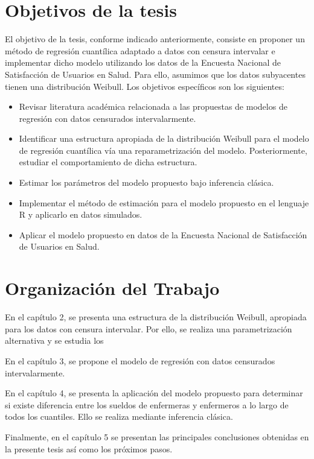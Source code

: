 \documentclass{report}
\begin{document}
\section{Objetivos de la tesis}
El objetivo de la tesis, conforme indicado anteriormente, consiste en proponer un método de regresión cuantílica adaptado a datos con censura intervalar e implementar dicho modelo utilizando los datos de la Encuesta Nacional de Satisfacción de Usuarios en Salud. Para ello, asumimos que los datos subyacentes tienen una distribución Weibull. Los objetivos específicos son los siguientes:

\begin{itemize}
	\item Revisar literatura académica relacionada a las propuestas de modelos de regresión con datos censurados intervalarmente.
	\item Identificar una estructura apropiada de la distribución Weibull para el modelo de regresión cuantílica vía una reparametrización del modelo. Posteriormente, estudiar el comportamiento de dicha estructura.
	\item Estimar los parámetros del modelo propuesto bajo inferencia clásica.
	\item Implementar el método de estimación para el modelo propuesto en el lenguaje R y aplicarlo en datos simulados.
	\item Aplicar el modelo propuesto en datos de la Encuesta Nacional de Satisfacción de Usuarios en Salud.
\end{itemize}

\section{Organización del Trabajo}

En el capítulo 2, se presenta una estructura de la distribución Weibull, apropiada para los datos con censura intervalar. Por ello, se realiza una parametrización alternativa y se estudia los 

En el capítulo 3, se propone el modelo de regresión con datos censurados intervalarmente.

En el capítulo 4, se presenta la aplicación del modelo propuesto para determinar si existe diferencia entre los sueldos de enfermeras y enfermeros a lo largo de todos los cuantiles. Ello se realiza mediante inferencia clásica.

Finalmente, en el capítulo 5 se presentan las principales conclusiones obtenidas en la presente tesis así como los próximos pasos.
\end{document}
